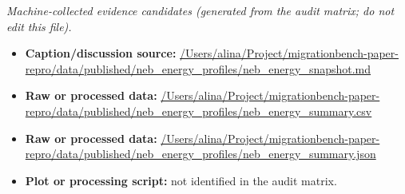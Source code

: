\emph{Machine-collected evidence candidates (generated from the audit matrix; do not edit this file).}
\begin{itemize}[leftmargin=1.4em,noitemsep]
\item \textbf{Caption/discussion source:} \url{/Users/alina/Project/migrationbench-paper-repro/data/published/neb_energy_profiles/neb_energy_snapshot.md}
\item \textbf{Raw or processed data:} \url{/Users/alina/Project/migrationbench-paper-repro/data/published/neb_energy_profiles/neb_energy_summary.csv}
\item \textbf{Raw or processed data:} \url{/Users/alina/Project/migrationbench-paper-repro/data/published/neb_energy_profiles/neb_energy_summary.json}
\item \textbf{Plot or processing script:} not identified in the audit matrix.
\end{itemize}
